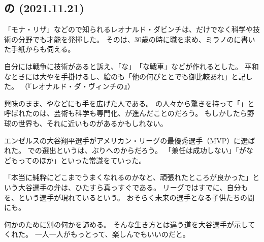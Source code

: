 \documentclass[12pt]{article}
\begin{document}
\begin{CJK}{UTF8}{ipxm}

    \section*{\centering{}の \space (2021.11.21)}
    「モナ・リザ」などので知られるレオナルド・ダビンチは、だけでなく科学や技術の分野でも才能を発揮した。
    そのは、30歳の時に職を求め、ミラノのに書いた手紙からも伺える。

    自分には戦争に技術があると訴え、「な」　「な戦車」などが作れるとした。
    平和なときには大やを手掛けるし、絵のも「他の何びととでも御比較あれ」と記した。
    （『レオナルド・ダ・ヴィンチの』）

    興味のまま、やなどにも手を広げた人である。
    の人々から驚きを持って「」と呼ばれたのは、芸術も科学も専門化、が進んだことのだろう。
    もしかしたら野球の世界も、それに近いものがあるかもしれない。

    エンゼルスの大谷翔平選手がアメリカン・リーグの最優秀選手（MVP）に選ばれた。
    での選出というは、ぶりへのからだろう。
    「兼任は成功しない」「がなどもってのほか」といった常識をていった。

    「本当に純粋にどこまでうまくなれるのかなと、頑張れたところが良かった」という大谷選手の弁は、ひたすら真っすぐである。
    リーグではすでに、自分もを、という選手が現れているという。
    おそらく未来の選手となる子供たちの間にも。

    何かのために別の何かを諦める。
    そんな生き方とは違う道を大谷選手が示してくれた。
    一人一人がもっとって、楽しんでもいいのだと。



\end{CJK}
\end{document}

